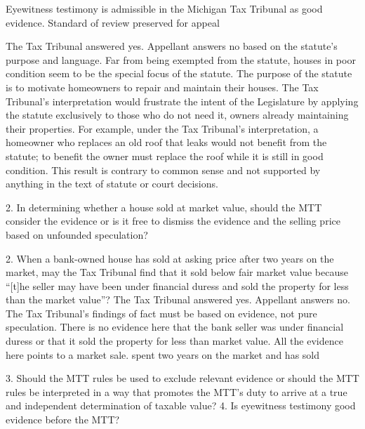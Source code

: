  
Eyewitness testimony is admissible in the Michigan Tax Tribunal as good evidence.
Standard of review
preserved for appeal
 
The Tax Tribunal answered yes. Appellant answers no based on the statute's purpose and language. Far from being exempted from the statute, houses in poor condition seem to be the special focus of the statute. The purpose of the statute is to motivate homeowners to repair and maintain their houses. The Tax Tribunal's interpretation would frustrate the intent of the Legislature by applying the statute exclusively to those who do not need it, owners already maintaining their properties. For example, under the Tax Tribunal's interpretation, a homeowner who replaces an old roof that leaks would not benefit from the statute; to benefit the owner must replace the roof while it is still in good condition. This result is contrary to common sense and not supported by anything in the text of statute or court decisions.
 
2. In determining whether a house sold at market value, should the MTT consider the evidence or is it free to dismiss the evidence and the selling price based on unfounded speculation?
 
2. When a bank-owned house has sold at asking price after two years on the market, may the Tax Tribunal find that it sold below fair market value because ``[t]he seller may have been under financial duress and sold the property for less than the market value''?
The Tax Tribunal answered yes. Appellant answers no. The Tax Tribunal's findings of fact must be based on evidence, not pure speculation. There is no evidence here that the bank seller was under financial duress or that it sold the property for less than market value. All the evidence here points to a market sale.
spent two years on the market and has sold
 
3. Should the MTT rules be used to exclude relevant evidence or should the MTT rules be interpreted in a way that promotes the MTT's duty to arrive at a true and independent determination of taxable value?
4. Is eyewitness testimony good evidence before the MTT?
